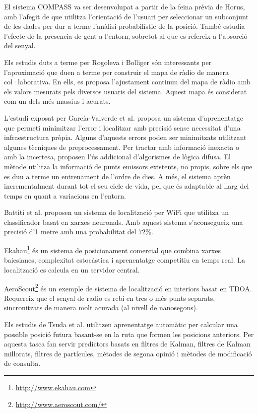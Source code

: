El sistema COMPASS \cite{king} va ser desenvolupat a partir de la feina prèvia de Horus, amb l’afegit de que utilitza l'orientació de l’usuari per seleccionar un subconjunt de les dades per dur a terme l’anàlisi probabilístic de la posició. També estudia l’efecte de la presencia de gent a l’entorn, sobretot al que es refereix a l’absorció del senyal.

Els estudis duts a terme per Rogoleva \cite{rogoleva} i Bolliger \cite{bolliger} són interessants per l’aproximació que duen a terme per construir el mapa de ràdio de manera col·laborativa. En ells, es proposa l’ajustament continuu del mapa de ràdio amb els valors mesurats pels diversos usuaris del sistema. Aquest mapa és considerat com un dels més massius i acurats.

L'estudi exposat per García-Valverde et al. \cite{garcia} proposa un sistema d'aprenentatge que permeti minimitzar l'error i localitzar amb precisió sense necessitat d'una infraestructura pròpia. Alguns d'aquests errors poden ser minimitzats utilitzant algunes tècniques de preprocessament.  Per tractar amb informació inexacta o amb la incertesa, proposen l'ús addicional d'algorismes de lògica difusa. El mètode utilitza la informació de punts emissors existents, no propis, sobre els que es duu a terme un entrenament de l'ordre de dies. A més, el sistema aprèn incrementalment durant tot el seu cicle de vida, pel que és adaptable al llarg del temps en quant a variacions en l’entorn.

Battiti et al. \cite{battiti} proposen un sistema de localització per WiFi que utilitza un classificador basat en xarxes neuronals. Amb aquest sistema s'aconsegueix una precisió d'1 metre amb una probabilitat del 72\%.

Ekahau\footnote{\url{http://www.ekahau.com}} és un sistema de posicionament comercial que combina xarxes baiesianes, complexitat estocàstica i aprenentatge competitiu en temps real. La localització es calcula en un servidor central.

AeroScout\footnote{\url{http://www.aeroscout.com/}} és un exemple de sistema de localització en interiors basat en TDOA. Requereix que el senyal de radio es rebi en tres o més punts separats, sincronitzats de manera molt acurada (al nivell de nanosegons).

Els estudis de Tsuda et al. \cite{tsuda} utilitzen aprenentatge automàtic per calcular una possible posició futura basant-se en la ruta que formen les posicions anteriors. Per aquesta tasca fan servir predictors basats en filtres de Kalman, filtres de Kalman millorats, filtres de partícules, mètodes de segona opinió i mètodes de modificació de consulta.


